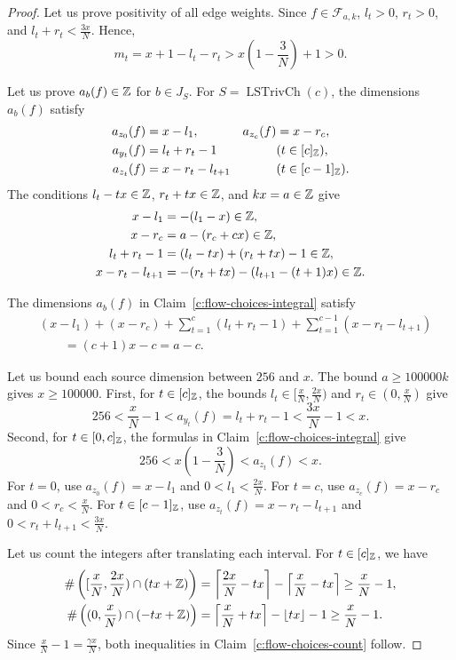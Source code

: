 \begin{proof}
 Let us prove positivity of all edge weights.
Since $f\in\mathcal F_{a,k}$, $l_t>0$, $r_t>0$, and $l_t+r_t<\frac{3x}{N}$. Hence,
\[
 m_t=x+1-l_t-r_t>x\left(1-\frac3N\right)+1>0.
\]

 Let us prove $a_b(f)\in\mathbb Z$ for $b\in J_S$.
For $S=\operatorname{LSTrivCh}(c)$, the dimensions $a_b(f)$ satisfy
\[
\begin{aligned}
 a_{z_0}(f)&=x-l_1,& a_{z_c}(f)&=x-r_c,\\
 a_{y_t}(f)&=l_t+r_t-1&&(t\in[c]_{\mathbb Z}),\\
 a_{z_t}(f)&=x-r_t-l_{t+1}&&(t\in[c-1]_{\mathbb Z}).
\end{aligned}
\]
 The conditions $l_t-tx\in\mathbb Z$, $r_t+tx\in\mathbb Z$, and
$kx=a\in\mathbb Z$ give
\[
\begin{aligned}
 x-l_1&=-(l_1-x)\in\mathbb Z,\\
 x-r_c&=a-(r_c+cx)\in\mathbb Z,\\
 l_t+r_t-1&=(l_t-tx)+(r_t+tx)-1\in\mathbb Z,\\
 x-r_t-l_{t+1}&=-(r_t+tx)-(l_{t+1}-(t+1)x)\in\mathbb Z.
\end{aligned}
\]

The dimensions $a_b(f)$ in Claim~\ref{c:flow-choices-integral} satisfy
\[
\begin{aligned}
 &(x-l_1)+(x-r_c)+\sum_{t=1}^c(l_t+r_t-1)
       +\sum_{t=1}^{c-1}(x-r_t-l_{t+1})\\
 &\qquad=(c+1)x-c=a-c.
\end{aligned}
\]

 Let us bound each source dimension between $256$ and $x$.
The bound $a\ge100000k$ gives $x\ge100000$.
First, for $t\in[c]_{\mathbb Z}$, the bounds $l_t\in[\frac{x}{N},\frac{2x}{N})$ and $r_t\in(0,\frac{x}{N})$ give
\[
 256<\frac{x}{N}-1<a_{y_t}(f)=l_t+r_t-1<\frac{3x}{N}-1<x.
\]
Second, for $t\in[0,c]_{\mathbb Z}$, the formulas in Claim~\ref{c:flow-choices-integral} give
\[
 256<x\left(1-\frac3N\right)<a_{z_t}(f)<x.
\]
For $t=0$, use $a_{z_0}(f)=x-l_1$ and $0<l_1<\frac{2x}{N}$.
For $t=c$, use $a_{z_c}(f)=x-r_c$ and $0<r_c<\frac{x}{N}$.
For $t\in[c-1]_{\mathbb Z}$, use $a_{z_t}(f)=x-r_t-l_{t+1}$ and $0<r_t+l_{t+1}<\frac{3x}{N}$.

 Let us count the integers after translating each interval.
For $t\in[c]_{\mathbb Z}$, we have
\[
 \begin{aligned}
 \#\left([\frac{x}{N},\frac{2x}{N})\cap(tx+\mathbb Z)\right)
 &=\left\lceil\frac{2x}{N}-tx\right\rceil
   -\left\lceil\frac{x}{N}-tx\right\rceil
 \ge\frac{x}{N}-1,\\
 \#\left((0,\frac{x}{N})\cap(-tx+\mathbb Z)\right)
 &=\left\lceil\frac{x}{N}+tx\right\rceil-\lfloor tx\rfloor-1
 \ge\frac{x}{N}-1.
 \end{aligned}
\]
Since $\frac{x}{N}-1=\frac{\gamma x}{N}$, both inequalities in Claim~\ref{c:flow-choices-count} follow.


\end{proof}
